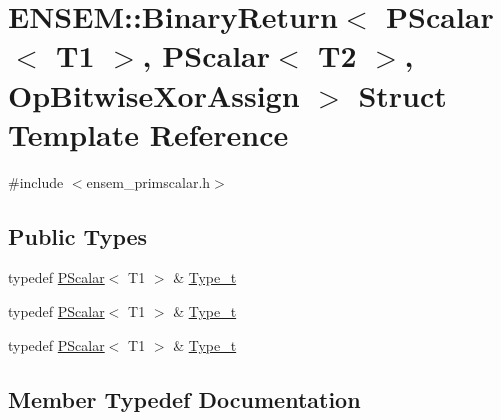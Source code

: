 \hypertarget{structENSEM_1_1BinaryReturn_3_01PScalar_3_01T1_01_4_00_01PScalar_3_01T2_01_4_00_01OpBitwiseXorAssign_01_4}{}\section{E\+N\+S\+EM\+:\+:Binary\+Return$<$ P\+Scalar$<$ T1 $>$, P\+Scalar$<$ T2 $>$, Op\+Bitwise\+Xor\+Assign $>$ Struct Template Reference}
\label{structENSEM_1_1BinaryReturn_3_01PScalar_3_01T1_01_4_00_01PScalar_3_01T2_01_4_00_01OpBitwiseXorAssign_01_4}


{\ttfamily \#include $<$ensem\+\_\+primscalar.\+h$>$}

\subsection*{Public Types}
\begin{DoxyCompactItemize}
\item 
typedef \mbox{\hyperlink{classENSEM_1_1PScalar}{P\+Scalar}}$<$ T1 $>$ \& \mbox{\hyperlink{structENSEM_1_1BinaryReturn_3_01PScalar_3_01T1_01_4_00_01PScalar_3_01T2_01_4_00_01OpBitwiseXorAssign_01_4_ad0194688bf01b3c6a40e163fb5235e3c}{Type\+\_\+t}}
\item 
typedef \mbox{\hyperlink{classENSEM_1_1PScalar}{P\+Scalar}}$<$ T1 $>$ \& \mbox{\hyperlink{structENSEM_1_1BinaryReturn_3_01PScalar_3_01T1_01_4_00_01PScalar_3_01T2_01_4_00_01OpBitwiseXorAssign_01_4_ad0194688bf01b3c6a40e163fb5235e3c}{Type\+\_\+t}}
\item 
typedef \mbox{\hyperlink{classENSEM_1_1PScalar}{P\+Scalar}}$<$ T1 $>$ \& \mbox{\hyperlink{structENSEM_1_1BinaryReturn_3_01PScalar_3_01T1_01_4_00_01PScalar_3_01T2_01_4_00_01OpBitwiseXorAssign_01_4_ad0194688bf01b3c6a40e163fb5235e3c}{Type\+\_\+t}}
\end{DoxyCompactItemize}


\subsection{Member Typedef Documentation}
\mbox{\label{structENSEM_1_1BinaryReturn_3_01PScalar_3_01T1_01_4_00_01PScalar_3_01T2_01_4_00_01OpBitwiseXorAssign_01_4_ad0194688bf01b3c6a40e163fb5235e3c}} 
